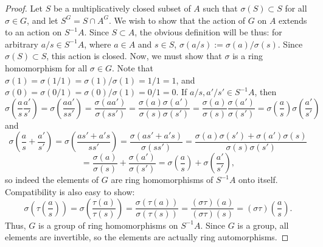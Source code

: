 \begin{proof}
Let $S$ be a multiplicatively closed subset of $A$ such that $\sigma(S) \subset S$ for all $\sigma \in G$, and let $S^G = S \cap A^G$. We wish to
show that the action of $G$ on $A$ extends to an action on $S^{-1}A$. Since $S \subset A$, the obvious definition will be thus: for arbitrary 
$a/s \in S^{-1}A$, where $a \in A$ and $s \in S$, $\sigma(a/s) := \sigma(a)/\sigma(s)$. Since $\sigma(S) \subset S$, this action is closed. Now, we must
show that $\sigma$ is a ring homomorphism for all $\sigma \in G$. Note that $\sigma(1) = \sigma(1/1) = \sigma(1)/\sigma(1) = 1/1 = 1$, and 
$\sigma(0) = \sigma(0/1) = \sigma(0)/\sigma(1) = 0/1 = 0$. If $a/s, a'/s' \in S^{-1}A$, then
$$\sigma\left(\frac{a}{s}\frac{a'}{s'}\right) = \sigma\left(\frac{a a'}{s s'}\right) = \frac{\sigma(a a')}{\sigma(s s')}
= \frac{\sigma(a)\sigma(a')}{\sigma(s)\sigma(s')} = \frac{\sigma(a)}{\sigma(s)}\frac{\sigma(a')}{\sigma(s')}
= \sigma\left(\frac{a}{s}\right)\sigma\left(\frac{a'}{s'}\right)$$
and
$$\sigma\left(\frac{a}{s} + \frac{a'}{s'}\right) = \sigma\left(\frac{a s' + a' s}{s s'}\right)
= \frac{\sigma(a s' + a' s)}{\sigma(s s')} = \frac{\sigma(a) \sigma(s') + \sigma(a')\sigma(s)}{\sigma(s)\sigma(s')}$$
$$= \frac{\sigma(a)}{\sigma(s)} + \frac{\sigma(a')}{\sigma(s')} = \sigma\left(\frac{a}{s}\right) + \sigma\left(\frac{a'}{s'}\right),$$
so indeed the elements of $G$ are ring homomorphisms of $S^{-1}A$ onto itself. Compatibility is also easy to show:
$$\sigma\left(\tau\left(\frac{a}{s}\right)\right) = \sigma\left(\frac{\tau(a)}{\tau(s)}\right)
= \frac{\sigma(\tau(a))}{\sigma(\tau(s))} = \frac{(\sigma\tau)(a)}{(\sigma\tau)(s)} = (\sigma\tau)\left(\frac{a}{s}\right).$$
Thus, $G$ is a group of ring homomorphisms on $S^{-1}A$. Since $G$ is a group, all elements are invertible, so the elements are actually
ring automorphisms.
\end{proof}

